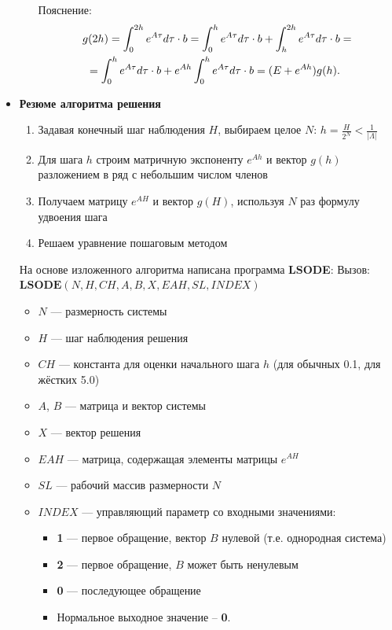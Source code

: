 \begin{itemize}[leftmargin=1em]
\begin{itemize}
			Пояснение:
			\begin{equation}
				\begin{aligned}
				g(2h) & = \int_0^{2h} e^{A\tau} d\tau \cdot b = \int_0^h e^{A\tau} d\tau \cdot b + \int_h^{2h} e^{A\tau} d\tau \cdot b = \nonumber\\
				& \hspace{-2em}= \int_0^h e^{A\tau} d\tau \cdot b + e^{Ah} \int_0^h e^{A\tau} d\tau \cdot b = (E + e^{Ah}) g(h).
				\end{aligned}
			\end{equation}
		\end{itemize}
		\item \textbf{Резюме алгоритма решения}
		\begin{enumerate}
			\item Задавая конечный шаг наблюдения $H$, выбираем целое $N$: 
			\(h = \frac{H}{2^N} < \frac{1}{|\Lambda|}\)
			\item Для шага $h$ строим матричную экспоненту $e^{Ah}$ и вектор $g(h)$ разложением в ряд с небольшим числом членов
			\item Получаем матрицу $e^{AH}$ и вектор $g(H)$, используя $N$ раз формулу удвоения шага
			\item Решаем уравнение пошаговым методом
		\end{enumerate}

		На основе изложенного алгоритма написана программа \textbf{LSODE}:
		\newline
		Вызов:
		\(\textbf{LSODE}(N, H, CH, A, B, X, EAH, SL, INDEX)\)
		
		\begin{itemize}[leftmargin=1.5em]
			\item $N$ — размерность системы
			\item $H$ — шаг наблюдения решения
			\item $CH$ — константа для оценки начального шага $h$ (для обычных 0.1, для жёстких 5.0)
			\item $A$, $B$ — матрица и вектор системы
			\item $X$ — вектор решения
			\item $EAH$ — матрица, содержащая элементы матрицы $e^{AH}$
			\item $SL$ — рабочий массив размерности $N$
			\item $INDEX$ — управляющий параметр со входными значениями:
			\begin{itemize}
				\item \textbf{1} — первое обращение, вектор $B$ нулевой (т.е. однородная система)
				\item \textbf{2} — первое обращение, $B$ может быть ненулевым
				\item \textbf{0} — последующее обращение
				\item Нормальное выходное значение – \textbf{0}. 
			\end{itemize}
		\end{itemize}
	\end{itemize}
	
